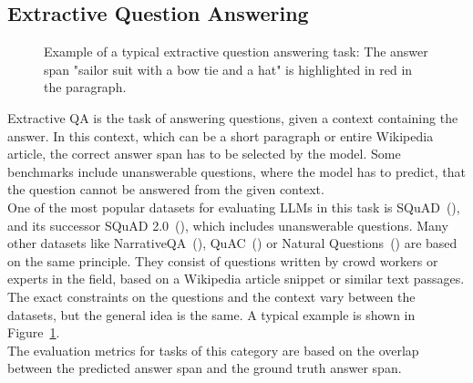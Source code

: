 \subsection{Extractive Question Answering}\label{sec:extractive-qa}
\begin{figure}[h]
    \centering
    \caption{Example of a typical extractive question answering task: The answer span "sailor suit with a bow tie and a hat" is highlighted in red in the paragraph.}
    \label{fig:extractive_qa_example}
\end{figure}
Extractive QA is the task of answering questions, given a context containing the answer.
In this context, which can be a short paragraph or entire Wikipedia article, the correct answer span has to be selected by the model.
Some benchmarks include unanswerable questions, where the model has to predict, that the question cannot be answered from the given context.
\\
One of the most popular datasets for evaluating LLMs in this task is SQuAD~(\cite{rajpurkar:2016}), and its successor SQuAD 2.0~(\cite{rajpurkar:2018}), which includes unanswerable questions.
Many other datasets like NarrativeQA~(\cite{kovcisky:2018}), QuAC~(\cite{choi:2018}) or Natural Questions~(\cite{kwiatkowski:2019}) are based on the same principle.
They consist of questions written by crowd workers or experts in the field, based on a Wikipedia article snippet or similar text passages.
The exact constraints on the questions and the context vary between the datasets, but the general idea is the same.
A typical example is shown in Figure~\ref{fig:extractive_qa_example}.
\\
The evaluation metrics for tasks of this category are based on the overlap between the predicted answer span and the ground truth answer span.
